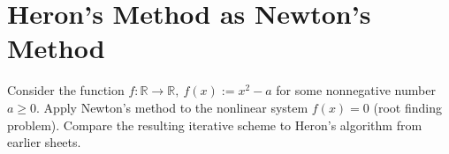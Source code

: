 \section{Heron's Method as Newton's Method}
Consider the function $f\colon \mathbb{R}\to\mathbb{R},~f(x):= x^2 -a$ for some nonnegative number $a\geq 0$.  Apply Newton's method to the nonlinear system $f(x)=0$ (root finding problem). Compare the resulting iterative scheme to Heron's algorithm from earlier sheets.
